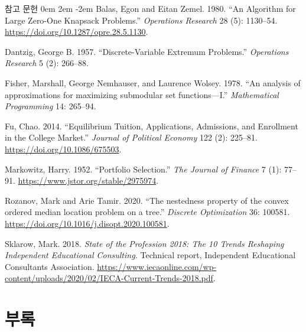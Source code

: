 \documentclass[10pt,slidestop,compress,mathserif,notheorems]{beamer}
\newif\ifen
\theoremstyle{definition}
\theoremstyle{definition}
\begin{document}
\begin{frame}[allowframebreaks]{\ifen References \else 참고 문헌 \fi}
\parskip 0em
\leftskip 2em
\parindent -2em
Balas, Egon and Eitan Zemel. 1980. ``An Algorithm for Large Zero-One Knapsack Problems.'' \emph{Operations Research} 28 (5): 1130--54. \url{https://doi.org/10.1287/opre.28.5.1130}. 

Dantzig, George B. 1957. ``Discrete-Variable Extremum Problems.'' \emph{Operations Research} 5 (2): 266--88.

Fisher, Marshall, George Nemhauser, and Laurence Wolsey. 1978. ``An analysis of approximations for maximizing submodular set functions—I.'' \emph{Mathematical Programming} 14: 265--94. 

Fu, Chao. 2014. ``Equilibrium Tuition, Applications, Admissions, and Enrollment in the College Market.'' \emph{Journal of Political Economy} 122 (2): 225--81. \url{https://doi.org/10.1086/675503}. 

Markowitz, Harry. 1952. ``Portfolio Selection.'' \emph{The Journal of Finance} 7 (1): 77--91. \url{https://www.jstor.org/stable/2975974}.

\framebreak

Rozanov, Mark and Arie Tamir. 2020. ``The nestedness property of the convex ordered median location problem on a tree.'' \emph{Discrete Optimization} 36: 100581. \url{https://doi.org/10.1016/j.disopt.2020.100581}.

Sklarow, Mark. 2018. \emph{State of the Profession 2018: The 10 Trends Reshaping Independent Educational Consulting.} Technical report, Independent Educational Consultants Association. \url{https://www.iecaonline.com/wp-content/uploads/2020/02/IECA-Current-Trends-2018.pdf}.

\end{frame}









\ifen \section{Appendix} \else \section{부록} \fi
\end{document}
